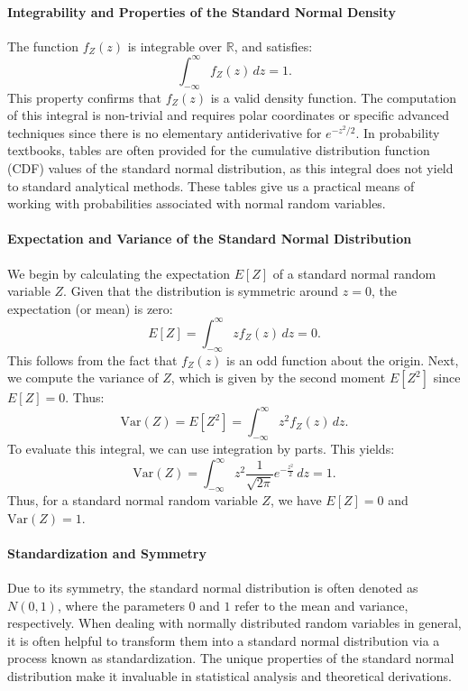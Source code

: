 \paragraph{Integrability and Properties of the Standard Normal Density}
The function \( f_Z(z) \) is integrable over \( \mathbb{R} \), and satisfies:
\[
\int_{-\infty}^{\infty} f_Z(z) \, dz = 1.
\]
This property confirms that \( f_Z(z) \) is a valid density function. The computation of this integral is non-trivial and requires polar coordinates or specific advanced techniques since there is no elementary antiderivative for \( e^{-z^2/2} \). \newline
In probability textbooks, tables are often provided for the cumulative distribution function (CDF) values of the standard normal distribution, as this integral does not yield to standard analytical methods. These tables give us a practical means of working with probabilities associated with normal random variables.

\paragraph{Expectation and Variance of the Standard Normal Distribution}
We begin by calculating the expectation \( E[Z] \) of a standard normal random variable \( Z \). Given that the distribution is symmetric around \( z = 0 \), the expectation (or mean) is zero:
\[
E[Z] = \int_{-\infty}^{\infty} z f_Z(z) \, dz = 0.
\]
This follows from the fact that \( f_Z(z) \) is an odd function about the origin. \newline
Next, we compute the variance of \( Z \), which is given by the second moment \( E[Z^2] \) since \( E[Z] = 0 \). Thus:
\[
\text{Var}(Z) = E[Z^2] = \int_{-\infty}^{\infty} z^2 f_Z(z) \, dz.
\]
To evaluate this integral, we can use integration by parts. This yields:
\[
\text{Var}(Z) = \int_{-\infty}^{\infty} z^2 \frac{1}{\sqrt{2 \pi}} e^{-\frac{z^2}{2}} \, dz = 1.
\]
Thus, for a standard normal random variable \( Z \), we have \( E[Z] = 0 \) and \( \text{Var}(Z) = 1 \).

\paragraph{Standardization and Symmetry}
Due to its symmetry, the standard normal distribution is often denoted as \( N(0,1) \), where the parameters \( 0 \) and \( 1 \) refer to the mean and variance, respectively. When dealing with normally distributed random variables in general, it is often helpful to transform them into a standard normal distribution via a process known as standardization. The unique properties of the standard normal distribution make it invaluable in statistical analysis and theoretical derivations.

